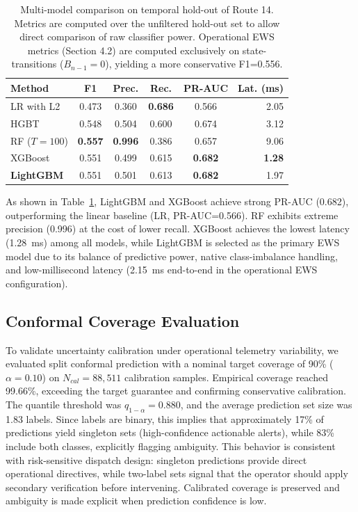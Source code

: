 \documentclass[fleqn,10pt,lineno]{wlpeerj}
\begin{document}
\begin{table}[htbp]
  \caption{Multi-model comparison on temporal hold-out of Route 14. Metrics are computed over the unfiltered hold-out set to allow direct comparison of raw classifier power. Operational EWS metrics (Section 4.2) are computed exclusively on state-transitions ($B_{n-1}=0$), yielding a more conservative F1=0.556.}
  \centering
  \begin{tabular}{@{}lccccr@{}}
    \toprule
    \textbf{Method} & \textbf{F1} & \textbf{Prec.} & \textbf{Rec.} & \textbf{PR-AUC} & \textbf{Lat. (ms)} \\ \midrule
    LR with L2      & 0.473 & 0.360 & \textbf{0.686} & 0.566 & 2.05 \\
    HGBT             & 0.548 & 0.504 & 0.600 & 0.674 & 3.12 \\
    RF ($T{=}100$)   & \textbf{0.557} & \textbf{0.996} & 0.386 & 0.657 & 9.06 \\
    XGBoost          & 0.551 & 0.499 & 0.615 & \textbf{0.682} & \textbf{1.28} \\
    \textbf{LightGBM}& 0.551 & 0.501 & 0.613 & \textbf{0.682} & 1.97 \\ \bottomrule
  \end{tabular}
  \label{tab:multimodel}
\end{table}

As shown in Table~\ref{tab:multimodel}, LightGBM and XGBoost achieve strong PR-AUC (0.682), outperforming the linear baseline (LR, PR-AUC=0.566). RF exhibits extreme precision (0.996) at the cost of lower recall. XGBoost achieves the lowest latency (1.28~ms) among all models, while LightGBM is selected as the primary EWS model due to its balance of predictive power, native class-imbalance handling, and low-millisecond latency (2.15~ms end-to-end in the operational EWS configuration).

\subsection{Conformal Coverage Evaluation}

To validate uncertainty calibration under operational telemetry variability, we evaluated split
conformal prediction with a nominal target coverage of 90\% ($\alpha=0.10$) on $N_{cal}=88{,}511$ calibration samples. Empirical coverage reached 99.66\%, exceeding the target guarantee and confirming conservative calibration. The quantile threshold was $q_{1-\alpha}=0.880$, and the average prediction set size was 1.83 labels. Since labels are binary, this implies that approximately 17\% of predictions yield singleton sets (high-confidence actionable alerts), while 83\% include both classes, explicitly flagging ambiguity.
 This behavior is consistent with risk-sensitive dispatch design:
singleton predictions provide direct operational directives, while two-label sets signal that the operator should apply secondary verification before intervening. Calibrated coverage is preserved and ambiguity is made explicit when prediction confidence is low.
\end{document}
